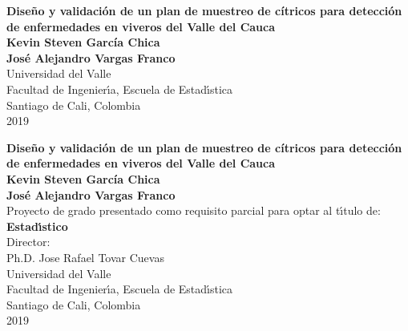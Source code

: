 
\begin{center}
\begin{figure}
\centering
{}
\end{figure}

\thispagestyle{empty}
\vspace*{2.0cm}

\textbf{\huge Dise\~{n}o y validaci\'{o}n de un plan de muestreo de c\'{i}tricos para detecci\'{o}n de enfermedades en viveros del Valle del Cauca}\\[5.0cm]

\Large\textbf{Kevin Steven Garc\'{i}a Chica}\\
\Large\textbf{Jos\'{e} Alejandro Vargas Franco}\\[4.0cm]
\small Universidad del Valle\\
Facultad de Ingenier\'{\i}a, Escuela de Estad\'{\i}stica\\
Santiago de Cali, Colombia\\
2019\\
\end{center}

\newpage{\pagestyle{empty}\cleardoublepage}

\newpage

\begin{center}
\thispagestyle{empty}
\vspace*{0cm}

\textbf{\huge Dise\~{n}o y validaci\'{o}n de un plan de muestreo de c\'{i}tricos para detecci\'{o}n de enfermedades en viveros del Valle del Cauca}\\[3.5cm]

\Large\textbf{Kevin Steven Garc\'{i}a Chica}\\
\Large\textbf{Jos\'{e} Alejandro Vargas Franco}\\[3.0cm]
\small Proyecto de grado presentado como requisito parcial para optar al t\'{\i}tulo de:\\
\textbf{Estad\'{\i}stico}\\[2.5cm]
Director:\\
Ph.D. Jose Rafael Tovar Cuevas\\[4.0cm]
Universidad del Valle\\
Facultad de Ingenier\'{\i}a, Escuela de Estad\'{\i}stica\\
Santiago de Cali, Colombia\\
2019\\
\end{center}

\newpage{\pagestyle{empty}\cleardoublepage}